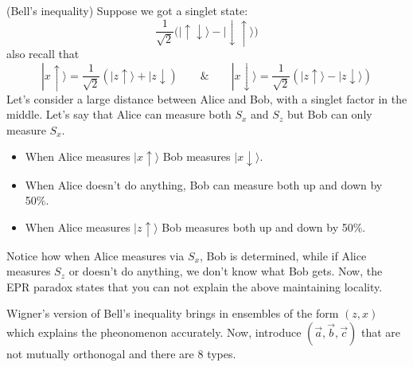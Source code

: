 \vspace{2ex}
\begin{defi}
(Bell's inequality) Suppose we got a singlet state:
\[\dfrac{1}{\sqrt{2}}\big(|\uparrow\downarrow\rangle -|\downarrow\uparrow\rangle \big)\]
also recall that
\[|x\uparrow\rangle =\dfrac{1}{\sqrt{2}}(|z\uparrow\rangle +|z\downarrow)\qquad\&\qquad |x\downarrow\rangle =\dfrac{1}{\sqrt{2}}(|z\uparrow\rangle -|z\downarrow\rangle )\]
Let's consider a large distance between Alice and Bob, with a singlet factor in the middle. Let's say that Alice can measure both $S_{x}$ and $S_{z}$ but Bob can only measure $S_{x}$.
\begin{itemize}
\item[(i)] When Alice measures $|x\uparrow\rangle $ Bob measures $|x\downarrow\rangle $.
\item[(ii)] When Alice doesn't do anything, Bob can measure both up and down by 50\%.
\item[(iii)] When Alice measures $|z\uparrow\rangle $ Bob measures both up and down by 50\%.
\end{itemize}
Notice how when Alice measures via $S_{x}$, Bob is determined, while if Alice measures $S_{z}$ or doesn't do anything, we don't know what Bob gets. Now, the EPR paradox states that you can not explain the above maintaining locality. 

\bigskip

Wigner's version of Bell's inequality brings in ensembles of the form $(z,x)$ which explains the pheonomenon accurately. Now, introduce $(\vec{a},\vec{b},\vec{c})$ that are not mutually orthonogal and there are 8 types. 
\end{defi}
\vspace{2ex}
 
